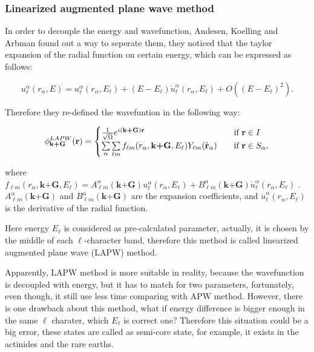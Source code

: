 \documentclass[a4paper, 12pt, titlepage,oneside,drop]{kthesis}
\begin{document}
\subsubsection{Linearized augmented plane wave method}
\noindent In order to decouple the energy and wavefunction, Andesen, Koelling and Arbman found out a way to seperate them, they noticed that the taylor expansion of the radial function
on certain energy, which can be expressed as follows:

\begin{equation}\label{ap3}
 u_{{\ell}}^{\alpha}(r_{\alpha}, E) = u_{{\ell}}^{\alpha}(r_{\alpha}, E_{\ell}) + (E-E_{\ell}) \dot{u}_{{\ell}}^{\alpha}(r_{\alpha}, E_{\ell}) + O((E-E_{\ell})^2).
\end{equation}

Therefore they re-defined the wavefuntion in the following way:

\begin{equation}\label{lap4}
\phi^{LAPW}_\textbf{k+G} (\textbf{r})= 
\begin{cases} \frac {1}{\sqrt{\Omega}} e^{i(\textbf{k+G})\textbf{r}} & \quad \mbox{if $\textbf{r} \in I $}
\\
\sumg<\alpha>\sum\limits_{{\ell}m} f_{{\ell}{m}} (r_{\alpha},\textbf{k+G}, E_{\ell}) Y_{{\ell}m}(\hat{\textbf{r}}_{\alpha})  & \quad \mbox{if $\textbf{r} \in S_\alpha, $}\\ 
\end{cases}
\end{equation}

where $f_{{\ell}{m}} (r_{\alpha},\textbf{k+G} ,E_{\ell}) =  A _{{\ell}m}^{\alpha} (\textbf {k+G}) u_{{\ell}}^{\alpha}(r_{\alpha}, E_{\ell}) + B _{{\ell}m}^{\alpha} (\textbf {k+G}) \dot{u}_{{\ell}}^{\alpha}(r_{\alpha}, E_{\ell})$
. $A _{{\ell}m}^{\alpha} (\textbf {k+G})$ and $B _{{\ell}m}^{\alpha} (\textbf {k+G})$ are the expansion coefficients, and $\dot{u}_{{\ell}}^{\alpha}(r_{\alpha}, E_{\ell} )$ is the derivative of the radial function.

Here energy $E_{\ell}$  is considered as pre-calculated parameter, actually, it is chosen by the middle of  each $\ell$-character band, therefore this method is called linearized augmented plane wave (LAPW) method.

Apparently, LAPW method is more suitable in reality, because the wavefunction is decoupled with energy, but it has to match for two parameters,
fortunately, even though, it still use less time comparing with APW method. However, there is one drawback about this method, what if energy difference is bigger enough in the same $ {\ell} $ charater, 
which $E_{\ell}$ is correct one? Therefore this situation could be a big error, these states are called as semi-core state, for example, it exists in the actinides and the rare earths.
\end{document}
